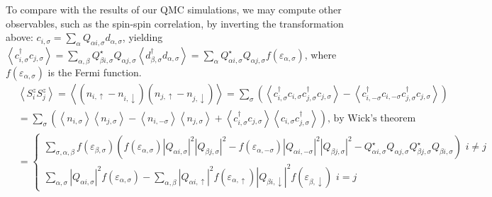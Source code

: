 To compare with the results of our \ac{QMC} simulations, we may compute other observables, such as the spin-spin correlation, by inverting the transformation above: $c_{i, \sigma} = \sum_{\alpha} Q_{\alpha i, \sigma} d_{\alpha, \sigma}$, yielding $\left\langle c_{i,\sigma}^\dagger c_{j,\sigma} \right\rangle = \sum_{\alpha, \beta} Q_{\beta i, \sigma}^\star Q_{\alpha j, \sigma} \left\langle d_{\beta,\sigma}^\dagger d_{\alpha,\sigma} \right\rangle = \sum_\alpha Q_{\alpha i, \sigma}^\star Q_{\alpha j, \sigma} f ( \varepsilon_{\alpha, \sigma} ) $, where $f (\varepsilon_{\alpha, \sigma})$ is the Fermi function.
\begin{equation}
\begin{split}
&\left\langle S_i^z S_j^z \right\rangle = \left\langle ( n_{i,\uparrow} -  n_{i,\downarrow} ) ( n_{j,\uparrow} -  n_{j,\downarrow} )  \right\rangle = \sum_{\sigma} \left( \left\langle c_{i,\sigma}^\dagger c_{i,\sigma} c_{j,\sigma}^\dagger c_{j,\sigma} \right\rangle - \left\langle c_{i,-\sigma}^\dagger c_{i,-\sigma} c_{j,\sigma}^\dagger c_{j,\sigma} \right\rangle \right) \\
&=\sum_{\sigma} \left( \left\langle n_{i,\sigma} \right\rangle \left\langle n_{j,\sigma} \right\rangle - \left\langle n_{i,-\sigma} \right\rangle \left\langle n_{j,\sigma} \right\rangle + \left\langle c_{i,\sigma}^\dagger c_{j,\sigma}  \right\rangle \left\langle c_{i,\sigma} c_{j,\sigma}^\dagger \right\rangle \right) , \, \text{by Wick's theorem} \\
&=
\begin{cases}
\sum_{\sigma, \alpha, \beta} f ( \varepsilon_{\beta, \sigma} ) \left( f ( \varepsilon_{\alpha, \sigma} ) | Q_{\alpha i, \sigma} |^2 | Q_{\beta j, \sigma} |^2  - f ( \varepsilon_{\alpha, -\sigma} ) | Q_{\alpha i, -\sigma} |^2 | Q_{\beta j, \sigma} |^2  - Q_{\alpha i, \sigma}^\star Q_{\alpha j, 
\sigma}  Q_{\beta j, \sigma}^\star Q_{\beta i, 
\sigma} \right) \,\, i \neq j \\
\sum_{\alpha,\sigma} | Q_{\alpha i, \sigma} |^2 f (\varepsilon_{\alpha, \sigma}) - \sum_{\alpha,\beta} | Q_{\alpha i, \uparrow} |^2 f (\varepsilon_{\alpha, \uparrow}) | Q_{\beta i, \downarrow} |^2 f (\varepsilon_{\beta, \downarrow}) \,\, i = j
\end{cases}
\end{split}
\end{equation}


